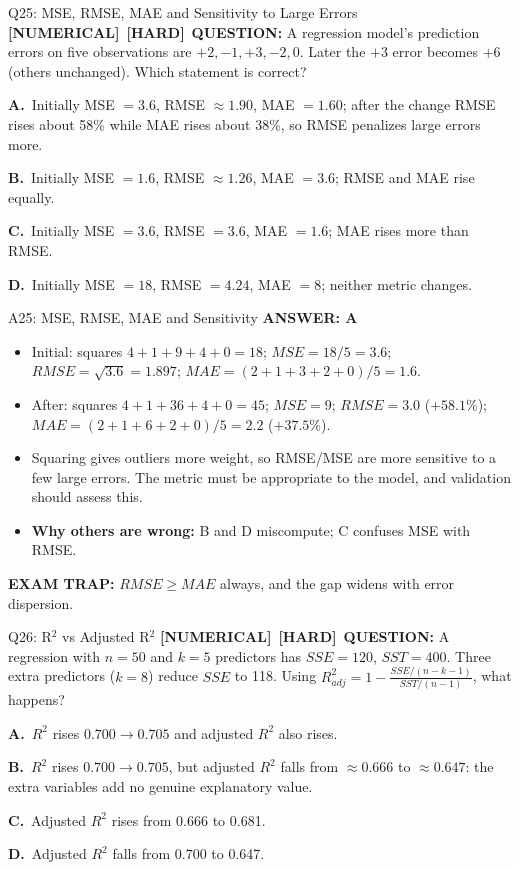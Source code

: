 \documentclass[8pt]{beamer}
\newcommand{\fs}{\fontsize{10}{12}\selectfont}
\newcommand{\opts}[4]{\par\vspace{0.12cm}\noindent\textbf{A.}~#1\par\vspace{0.08cm}\noindent\textbf{B.}~#2\par\vspace{0.08cm}\noindent\textbf{C.}~#3\par\vspace{0.08cm}\noindent\textbf{D.}~#4\par}
\newcommand{\ans}[1]{\textcolor{myblue}{\textbf{ANSWER: #1}}}
\newcommand{\trap}[1]{\textcolor{myred}{\textbf{EXAM TRAP:}} #1}
\newcommand{\numtag}{\textcolor{mypurple}{\textbf{[NUMERICAL]}}}
\newcommand{\hard}{\textcolor{myorange}{\textbf{[HARD]}}}
\begin{document}
\begin{frame}[t]{Q25: MSE, RMSE, MAE and Sensitivity to Large Errors}
\fs
\numtag\ \hard\ \textbf{QUESTION:} A regression model's prediction errors on five observations are $+2,-1,+3,-2,0$. Later the $+3$ error becomes $+6$ (others unchanged). Which statement is correct?
\opts{Initially MSE $=3.6$, RMSE $\approx1.90$, MAE $=1.60$; after the change RMSE rises about 58\% while MAE rises about 38\%, so RMSE penalizes large errors more.}
{Initially MSE $=1.6$, RMSE $\approx1.26$, MAE $=3.6$; RMSE and MAE rise equally.}
{Initially MSE $=3.6$, RMSE $=3.6$, MAE $=1.6$; MAE rises more than RMSE.}
{Initially MSE $=18$, RMSE $=4.24$, MAE $=8$; neither metric changes.}
\end{frame}

\begin{frame}[t]{A25: MSE, RMSE, MAE and Sensitivity}
\fs
\ans{A}
\begin{itemize}
\item Initial: squares $4+1+9+4+0=18$; $MSE=18/5=3.6$; $RMSE=\sqrt{3.6}=1.897$; $MAE=(2+1+3+2+0)/5=1.6$.
\item After: squares $4+1+36+4+0=45$; $MSE=9$; $RMSE=3.0$ ($+58.1\%$); $MAE=(2+1+6+2+0)/5=2.2$ ($+37.5\%$).
\item Squaring gives outliers more weight, so RMSE/MSE are more sensitive to a few large errors. The metric must be appropriate to the model, and validation should assess this.
\item \textbf{Why others are wrong:} B and D miscompute; C confuses MSE with RMSE.
\end{itemize}
\trap{$RMSE\ge MAE$ always, and the gap widens with \textcolor{myblue}{error dispersion}.}
\end{frame}

\begin{frame}[t]{Q26: R$^2$ vs Adjusted R$^2$}
\fs
\numtag\ \hard\ \textbf{QUESTION:} A regression with $n=50$ and $k=5$ predictors has $SSE=120$, $SST=400$. Three extra predictors ($k=8$) reduce $SSE$ to 118. Using $R^2_{adj}=1-\frac{SSE/(n-k-1)}{SST/(n-1)}$, what happens?
\opts{$R^2$ rises $0.700\to0.705$ and adjusted $R^2$ also rises.}
{$R^2$ rises $0.700\to0.705$, but adjusted $R^2$ falls from $\approx0.666$ to $\approx0.647$: the extra variables add no genuine explanatory value.}
{Adjusted $R^2$ rises from 0.666 to 0.681.}
{Adjusted $R^2$ falls from 0.700 to 0.647.}
\end{frame}
\end{document}
